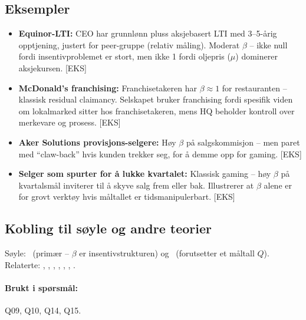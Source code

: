 \subsection*{Eksempler}
\begin{itemize}\setlength{\itemsep}{2pt}
\item \textbf{Equinor-LTI:} CEO har grunnlønn pluss aksjebasert LTI med 3--5-årig opptjening, justert for peer-gruppe (relativ måling). Moderat $\beta$ -- ikke null fordi insentivproblemet er stort, men ikke 1 fordi oljepris ($\mu$) dominerer aksjekursen. [EKS]
\item \textbf{McDonald's franchising:} Franchisetakeren har $\beta\approx 1$ for restauranten -- klassisk residual claimancy. Selskapet bruker franchising fordi spesifik viden om lokalmarked sitter hos franchisetakeren, mens HQ beholder kontroll over merkevare og prosess. [EKS]
\item \textbf{Aker Solutions provisjons-selgere:} Høy $\beta$ på salgskommisjon -- men paret med ``claw-back'' hvis kunden trekker seg, for å demme opp for gaming. [EKS]
\item \textbf{Selger som spurter for å lukke kvartalet:} Klassisk gaming -- høy $\beta$ på kvartalsmål inviterer til å skyve salg frem eller bak. Illustrerer at $\beta$ alene er for grovt verktøy hvis måltallet er tidsmanipulerbart. [EKS]
\end{itemize}

\subsection*{Kobling til søyle og andre teorier}
Søyle: \SThree\ (primær -- $\beta$ er insentivstrukturen) og \STwo\ (forutsetter et måltall $Q$). Relaterte: , , , , , , .

\paragraph{Brukt i spørsmål:} Q09, Q10, Q14, Q15.
